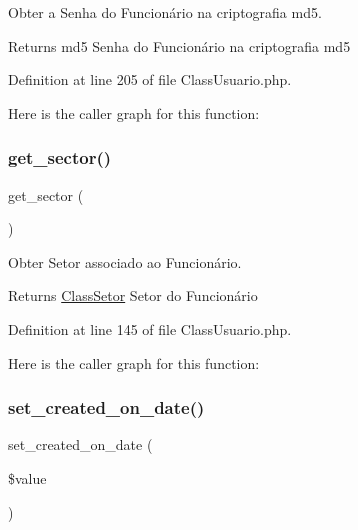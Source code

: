 Obter a Senha do Funcionário na criptografia md5. 

\begin{DoxyReturn}{Returns}
md5 Senha do Funcionário na criptografia md5 
\end{DoxyReturn}


Definition at line 205 of file Class\+Usuario.\+php.

Here is the caller graph for this function\+:
\mbox{\label{class_class_usuario_a31b79003e5d3bc648bb381b59f0088bd}} 
\subsubsection{\texorpdfstring{get\+\_\+sector()}{get\_sector()}}
{\footnotesize\ttfamily get\+\_\+sector (\begin{DoxyParamCaption}{ }\end{DoxyParamCaption})}



Obter Setor associado ao Funcionário. 

\begin{DoxyReturn}{Returns}
\hyperlink{class_class_setor}{Class\+Setor} Setor do Funcionário 
\end{DoxyReturn}


Definition at line 145 of file Class\+Usuario.\+php.

Here is the caller graph for this function\+:
\mbox{\label{class_class_usuario_a792b5876e9d76a4f030e436aeec2a855}} 
\subsubsection{\texorpdfstring{set\+\_\+created\+\_\+on\+\_\+date()}{set\_created\_on\_date()}}
{\footnotesize\ttfamily set\+\_\+created\+\_\+on\+\_\+date (\begin{DoxyParamCaption}\item[{}]{\$value }\end{DoxyParamCaption})}



